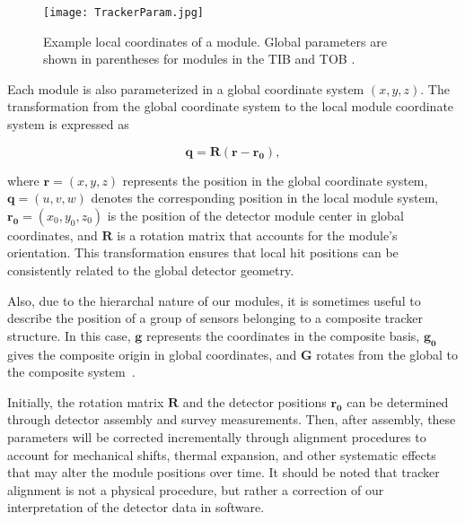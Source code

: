 \begin{figure}[!htb]
    \begin{center}
        \texttt{[image: TrackerParam.jpg]}
        \caption{Example local coordinates of a module. Global parameters are shown in parentheses for modules in the TIB and TOB \cite{WAdam_2009}.}
        \label{fig:TrackerParam}
    \end{center}
\end{figure}

Each module is also parameterized in a global coordinate system $(x, y, z)$. The transformation from the global coordinate system to the local module coordinate system is expressed as

\begin{equation}
    \mathbf{q} = \mathbf{R} (\mathbf{r} - \mathbf{r_0}),
\end{equation}  

where $\mathbf{r} = (x,y,z)$ represents the position in the global coordinate system, $\mathbf{q} = (u,v,w)$ denotes the corresponding position in the local module system, $\mathbf{r_0} = (x_0,y_0,z_0)$ is the position of the detector module center in global coordinates, and $\mathbf{R}$ is a rotation matrix that accounts for the module's orientation. This transformation ensures that local hit positions can be consistently related to the global detector geometry. 

Also, due to the hierarchal nature of our modules, it is sometimes useful to describe the position of a group of sensors belonging to a composite tracker structure. In this case, $\mathbf{g}$ represents the coordinates in the composite basis, $\mathbf{g_0}$ gives the composite origin in global coordinates, and $\mathbf{G}$ rotates from the global to the composite system~\cite{Karimaki:926537}.

Initially, the rotation matrix $\mathbf{R}$ and the detector positions $\mathbf{r_0}$ can be determined through detector assembly and survey measurements. Then, after assembly, these parameters will be corrected incrementally through alignment procedures to account for mechanical shifts, thermal expansion, and other systematic effects that may alter the module positions over time. It should be noted that tracker alignment is not a physical procedure, but rather a correction of our interpretation of the detector data in software. 



